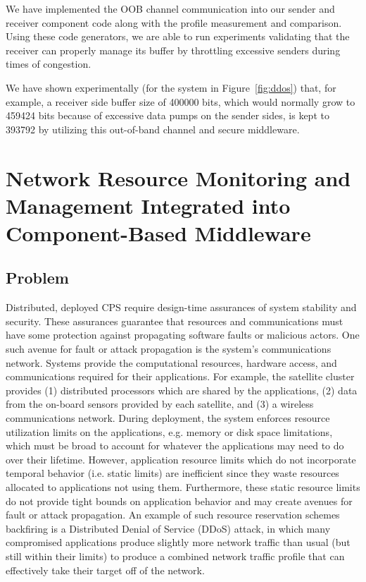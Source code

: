 We have implemented the OOB channel communication into our sender and
receiver component code along with the profile measurement and
comparison.  Using these code generators, we are able to run
experiments validating that the receiver can properly manage its
buffer by throttling excessive senders during times of congestion. 

We have shown experimentally (for the system in Figure~\ref{fig:ddos})
that, for example, a receiver side buffer size of 400000 bits, which
would normally grow to 459424 bits because of excessive data pumps on
the sender sides, is kept to 393792 by utilizing this out-of-band
channel and secure middleware.

\iffalse

\section{Network Resource Monitoring and Management Integrated into Component-Based Middleware}
\label{sec:drems}

\subsection{Problem}
Distributed, deployed CPS require design-time assurances of system
stability and security.  These assurances guarantee that resources and
communications must have some protection against propagating software
faults or malicious actors.  One such avenue for fault or attack
propagation is the system's communications network.  Systems provide
the computational resources, hardware access, and communications
required for their applications.  For example, the satellite cluster
provides (1) distributed processors which are shared by the
applications, (2) data from the on-board sensors provided by each
satellite, and (3) a wireless communications network.  During
deployment, the system enforces resource utilization limits on the
applications, e.g. memory or disk space limitations, which must be
broad to account for whatever the applications may need to do over
their lifetime.  However, application resource limits which do not
incorporate temporal behavior (i.e. static limits) are inefficient
since they waste resources allocated to applications not using them.
Furthermore, these static resource limits do not provide tight bounds
on application behavior and may create avenues for fault or attack
propagation.  An example of such resource reservation schemes
backfiring is a Distributed Denial of Service (DDoS) attack, in which
many compromised applications produce slightly more network traffic
than usual (but still within their limits) to produce a combined
network traffic profile that can effectively take their target off of
the network.

